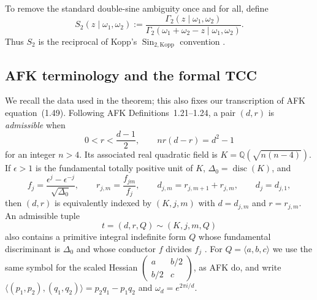 \documentclass[11pt]{article}
\newcommand{\Q}{\mathbb Q}
\begin{document}
To remove the standard double-sine ambiguity once and for all, define
\[
 S_2(z\mid\omega_1,\omega_2)
 :=\frac{\Gamma_2(z\mid\omega_1,\omega_2)}
 {\Gamma_2(\omega_1+\omega_2-z\mid\omega_1,\omega_2)}.
\tag{1}
\]
Thus $S_2$ is the reciprocal of Kopp's
$\operatorname{Sin}_{2,\mathrm{Kopp}}$ convention
\cite[Definition~4.22, equation~(4.8)]{Kopp}.

\subsection{AFK terminology and the formal TCC}

We recall the data used in the theorem; this also fixes our transcription
of AFK equation~(1.49).  Following AFK Definitions~1.21--1.24, a pair
$(d,r)$ is \emph{admissible} when
\[
 0<r<\frac{d-1}{2},\qquad nr(d-r)=d^2-1
\]
for an integer $n>4$.  Its associated real quadratic field is
$K=\Q(\sqrt{n(n-4)})$.  If $\epsilon>1$ is the fundamental totally
positive unit of $K$, $\Delta_0=\operatorname{disc}(K)$, and
\[
 f_j=\frac{\epsilon^j-\epsilon^{-j}}{\sqrt{\Delta_0}},\qquad
 r_{j,m}=\frac{f_{jm}}{f_j},\qquad
 d_{j,m}=r_{j,m+1}+r_{j,m},\qquad d_j=d_{j,1},
\]
then $(d,r)$ is equivalently indexed by $(K,j,m)$ with
$d=d_{j,m}$ and $r=r_{j,m}$.  An admissible tuple
\[
 t=(d,r,Q)\sim(K,j,m,Q)
\]
also contains a primitive integral indefinite form $Q$ whose fundamental
discriminant is $\Delta_0$ and whose conductor $f$ divides $f_j$
\cite[Definitions~1.27--1.28]{AFK}.
For $Q=\langle a,b,c\rangle$ we use the same symbol for the scaled
Hessian $\left(\begin{smallmatrix}a&b/2\\b/2&c\end{smallmatrix}\right)$,
as AFK do, and write
$\langle(p_1,p_2),(q_1,q_2)\rangle=p_2q_1-p_1q_2$ and
$\omega_d=e^{2\pi i/d}$.
\end{document}
